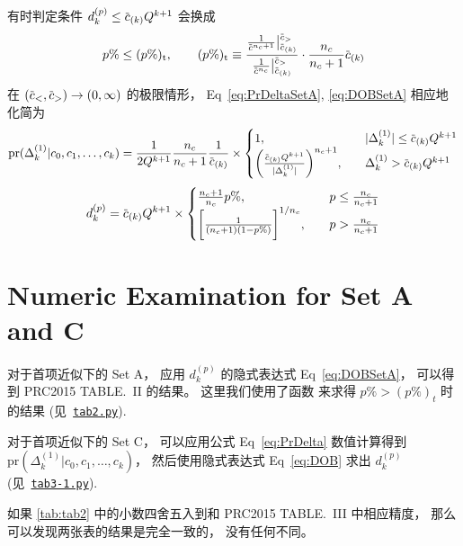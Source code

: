 \documentclass[12pt]{article}
\newcommand*\dmspr{\textrm{pr}}
\newcommand*\dmsvat[3][\big]{#1|_{\raise3pt\hbox{$\scriptstyle#2$}}^{\lower3pt\hbox{$\scriptstyle#3$}}}
\def\dmscbar{\dmsbar{c}}
\def\dmsccck{c_0,c_1,\ldots,c_k}
\def\dmsdeltako{\Delta_k^{(1)}}
\def\dmsdkp{d_k^{(p)}}
\begin{document}
有时判定条件 $\dmsdkp\le\dmscbar_{(k)}Q^{k+1}$ 会换成
\begin{equation}
  p\%\le(p\%)_{\textrm{t}},
  \qquad (p\%)_{\textrm{t}}\equiv
  \frac{\frac{1}{\dmscbar^{n_c+1}}\dmsvat{\dmscbar_{(k)}}{\dmscbar_>}}{
    \frac{1}{\dmscbar^{n_c}}\dmsvat{\dmscbar_{(k)}}{\dmscbar_>}}
  \cdot \frac{n_c}{n_c+1}\dmscbar_{(k)}
\end{equation}
在 $(\dmscbar_<,\dmscbar_>)\to(0,\infty)$ 的极限情形，
Eq~\eqref{eq:PrDeltaSetA}, \eqref{eq:DOBSetA} 相应地化简为
\begin{equation}
  \dmspr(\dmsdeltako|\dmsccck)= \frac{1}{2Q^{k+1}} \frac{n_c}{n_c+1}
  \frac{1}{\dmscbar_{(k)}}\times
  \begin{cases}
    1,&\quad |\dmsdeltako|\le\dmscbar_{(k)}Q^{k+1}\\
    \biggl( \frac{\dmscbar_{(k)}Q^{k+1}}{|\dmsdeltako|}\biggr)^{n_c+1},
    &\quad \dmsdeltako > \dmscbar_{(k)}Q^{k+1}
  \end{cases}
\end{equation}
\begin{equation}
  \dmsdkp = \dmscbar_{(k)}Q^{k+1}\times
  \begin{cases}
    \frac{n_c+1}{n_c}p\%,
    &\quad p\le \frac{n_c}{n_c+1}\\
    \biggl[ \frac{1}{(n_c+1)(1-p\%)}\biggr]^{1/n_c},
    &\quad p > \frac{n_c}{n_c+1}
  \end{cases}
\end{equation}

\section{Numeric Examination for Set A and C}
对于首项近似下的 Set A，
应用 $\dmsdkp$ 的隐式表达式 Eq~\eqref{eq:DOBSetA}，
可以得到 PRC2015 TABLE.~II 的结果。
这里我们使用了函数 
来求得 $p\%>(p\%)_t$ 时的结果
(见~\href{https://github.com/Dou-Meishi/bayesforerror/blob/master/code/tab2.py}{\texttt{tab2.py}}).

对于首项近似下的 Set C，
可以应用公式 Eq~\eqref{eq:PrDelta} 数值计算得到 $\dmspr(\dmsdeltako|
\dmsccck)$，
然后使用隐式表达式 Eq~\eqref{eq:DOB} 求出 $\dmsdkp$
(见~\href{https://github.com/Dou-Meishi/bayesforerror/blob/master/code/tab3-1.py}{\texttt{tab3-1.py}}).

如果 \autoref{tab:tab2} 中的小数四舍五入到和 PRC2015 TABLE.~III 中相应精度，
那么可以发现两张表的结果是完全一致的，
没有任何不同。


\end{document}
